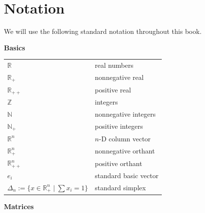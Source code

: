 \documentclass[
]{book}
\theoremstyle{definition}
\theoremstyle{definition}
\theoremstyle{definition}
\theoremstyle{definition}
\theoremstyle{remark}
\begin{document}
\chapter*{Notation}\label{notation}

We will use the following standard notation throughout this book.

\textbf{Basics}

\begin{longtable}[]{@{}
  >{\raggedright\arraybackslash}p{}
  >{\raggedright\arraybackslash}p{}@{}}
\toprule\noalign{}
\endhead
\bottomrule\noalign{}
\endlastfoot
\(\mathbb{R}^{}\) & real numbers \\
\(\mathbb{R}^{}_{+}\) & nonnegative real \\
\(\mathbb{R}^{}_{++}\) & positive real \\
\(\mathbb{Z}\) & integers \\
\(\mathbb{N}\) & nonnegative integers \\
\(\mathbb{N}_{+}\) & positive integers \\
\(\mathbb{R}^{n}\) & \(n\)-D column vector \\
\(\mathbb{R}^{n}_{+}\) & nonnegative orthant \\
\(\mathbb{R}^{n}_{++}\) & positive orthant \\
\(e_i\) & standard basic vector \\
\(\Delta_n := \{x \in \mathbb{R}^n_{+} \mid \sum x_i = 1 \}\) & standard simplex \\
\end{longtable}

\textbf{Matrices}
\end{document}
